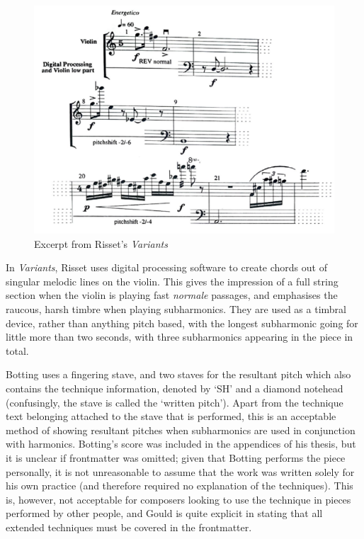 \begin{figure}
  \includegraphics[]{./resources/rissetALFExcerpt.pdf}
  \caption{Excerpt from Risset's \emph{Variants}}\label{fig:Excerpt from Risset's Variants}\end{figure}

In \emph{Variants}, Risset uses digital processing software to create chords out of singular melodic lines on the violin.
This gives the impression of a full string section when the violin is playing fast \emph{normale} passages, and emphasises the raucous, harsh timbre when playing subharmonics.
They are used as a timbral device, rather than anything pitch based, with the longest subharmonic going for little more than two seconds, with three subharmonics appearing in the piece in total.


Botting uses a fingering stave, and two staves for the resultant pitch which also contains the technique information, denoted by `SH' and a diamond notehead (confusingly, the stave is called the `written pitch').\autocite[109]{bottingDevelopingPersonalVocabulary2019}
Apart from the technique text belonging attached to the stave that is performed, this is an acceptable method of showing resultant pitches when subharmonics are used in conjunction with harmonics.
Botting's score was included in the appendices of his thesis, but it is unclear if frontmatter was omitted; given that Botting performs the piece personally, it is not unreasonable to assume that the work was written solely for his own practice (and therefore required no explanation of the techniques).
This is, however, not acceptable for composers looking to use the technique in pieces performed by other people, and Gould is quite explicit in stating that all extended techniques must be covered in the frontmatter.\autocite[494]{gouldBars2011}


